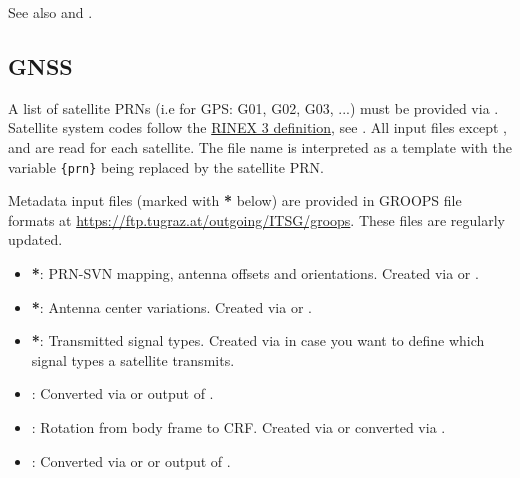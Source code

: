 See also  and .


\subsection{GNSS}\label{gnssTransmitterGeneratorType:gnss}
A list of satellite PRNs (i.e for GPS: G01, G02, G03, ...) must be provided via
. Satellite system codes follow the
\href{https://files.igs.org/pub/data/format/rinex305.pdf}{RINEX 3 definition}, see .
All input files except ,
and  are read for each satellite.
The file name is interpreted as a template with the variable \verb|{prn}| being replaced by the satellite PRN.

Metadata input files (marked with \textbf{*} below) are provided in GROOPS file formats at
\url{https://ftp.tugraz.at/outgoing/ITSG/groops}. These files are regularly updated.
\begin{itemize}
  \item {}\textbf{*}:
        PRN-SVN mapping, antenna offsets and orientations.
        Created via  or .
  \item {}\textbf{*}:
        Antenna center variations.
        Created via  or .
  \item {}\textbf{*}:
        Transmitted signal types.
        Created via  in case you want to define which signal
        types a satellite transmits.
  \item {}: Converted via  or
        output of .
  \item {}:
        Rotation from body frame to CRF. Created via  or converted via .
  \item {}:
        Converted via  or  or
        output of .
\end{itemize}


